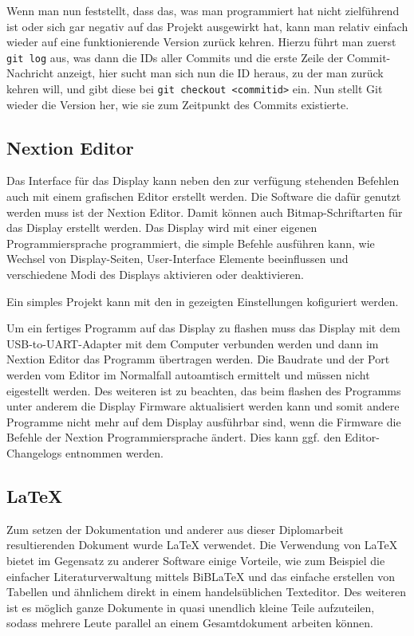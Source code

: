 Wenn man nun feststellt, dass das, was man programmiert hat nicht zielführend ist oder sich gar negativ auf das Projekt ausgewirkt hat, kann man relativ einfach wieder auf eine funktionierende Version zurück kehren. Hierzu führt man zuerst \texttt{git log} aus, was dann die IDs aller Commits und die erste Zeile der Commit-Nachricht anzeigt, hier sucht man sich nun die ID heraus, zu der man zurück kehren will, und gibt diese bei \texttt{git checkout <commitid>} ein. Nun stellt Git wieder die Version her, wie sie zum Zeitpunkt des Commits existierte.

\subsection{Nextion Editor} %
Das Interface für das Display kann neben den zur verfügung stehenden Befehlen auch mit einem grafischen Editor erstellt werden. Die Software die dafür genutzt werden muss ist der Nextion Editor. Damit können auch Bitmap-Schriftarten für das
Display erstellt werden. Das Display wird mit einer eigenen Programmiersprache programmiert, die simple Befehle ausführen kann, wie Wechsel von Display-Seiten, User-Interface Elemente beeinflussen und verschiedene Modi des Displays aktivieren
oder deaktivieren.

Ein simples Projekt kann mit den in  gezeigten Einstellungen kofiguriert werden.


Um ein fertiges Programm auf das Display zu flashen muss das Display mit dem \gls{USB-to-UART}-Adapter mit dem Computer verbunden werden und dann im Nextion Editor das Programm übertragen werden. Die Baudrate und der Port werden vom Editor im Normalfall autoamtisch ermittelt und müssen nicht eigestellt werden. Des weiteren ist zu beachten, das beim flashen des Programms unter anderem die Display Firmware aktualisiert werden kann und somit andere Programme nicht mehr auf dem Display ausführbar sind, wenn die Firmware die Befehle der Nextion Programmiersprache ändert. Dies kann ggf. den Editor-Changelogs entnommen werden.


\subsection{\LaTeX{}}
Zum setzen der Dokumentation und anderer aus dieser Diplomarbeit resultierenden Dokument wurde \LaTeX{} verwendet. Die Verwendung von \LaTeX{} bietet im Gegensatz zu anderer Software einige Vorteile, wie zum Beispiel die einfacher Literaturverwaltung mittels BiB\LaTeX{} und das einfache erstellen von Tabellen und ähnlichem direkt in einem handelsüblichen Texteditor. Des weiteren ist es möglich ganze Dokumente in quasi unendlich kleine Teile aufzuteilen, sodass mehrere Leute parallel an einem Gesamtdokument arbeiten können.